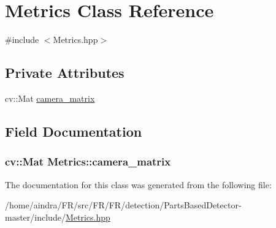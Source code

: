 \hypertarget{classMetrics}{\section{\-Metrics \-Class \-Reference}
\label{classMetrics}
}


{\ttfamily \#include $<$\-Metrics.\-hpp$>$}

\subsection*{\-Private \-Attributes}
\begin{DoxyCompactItemize}
\item 
cv\-::\-Mat \hyperlink{classMetrics_aba72e7e31eb9057d1252e61cdf3aa904}{camera\-\_\-matrix}
\end{DoxyCompactItemize}


\subsection{\-Field \-Documentation}
\hypertarget{classMetrics_aba72e7e31eb9057d1252e61cdf3aa904}{
\subsubsection[{camera\-\_\-matrix}]{\setlength{\rightskip}{0pt plus 5cm}cv\-::\-Mat {\bf \-Metrics\-::camera\-\_\-matrix}}}\label{classMetrics_aba72e7e31eb9057d1252e61cdf3aa904}


\-The documentation for this class was generated from the following file\-:\begin{DoxyCompactItemize}
\item 
/home/aindra/\-F\-R/src/\-F\-R/\-F\-R/detection/\-Parts\-Based\-Detector-\/master/include/\hyperlink{Metrics_8hpp}{\-Metrics.\-hpp}\end{DoxyCompactItemize}
